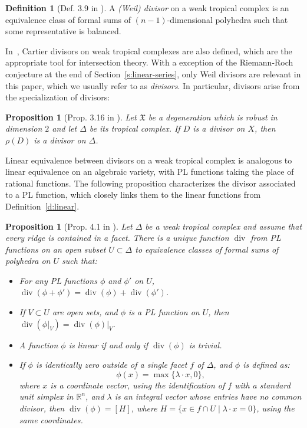 \documentclass[11pt]{amsart}
\newtheorem{prop}[thm]{Proposition}
\theoremstyle{definition}
\newtheorem{defn}[thm]{Definition}
\newcommand{\defi}[1]{\emph{#1}}
\renewcommand{\div}{\operatorname{div}}
\newcommand{\RR}{\mathbb R}
\newcommand{\X}{\mathfrak X}
\begin{document}
\begin{defn}[Def. 3.9 in \cite{cartwright-complexes}]\label{d:divisor}
A \defi{(Weil) divisor} on a weak tropical complex is an equivalence class of
formal sums of $(n-1)$-dimensional polyhedra such that some 
representative is balanced.
\end{defn}

In~\cite{cartwright-complexes}, Cartier divisors on weak tropical complexes are
also defined, which are the appropriate tool for intersection theory. With a
exception of the Riemann-Roch conjecture at the end of
Section~\ref{s:linear-series}, only Weil divisors are relevant in this paper, which we
usually refer to as \defi{divisors}. In particular, divisors arise from the
specialization of divisors:

\begin{prop}[Prop. 3.16 in \cite{cartwright-complexes}]\label{p:specialization-weil}
Let $\X$ be a degeneration which is robust in dimension $2$ and let $\Delta$ be
its tropical complex. If $D$ is a divisor on $X$, then $\rho(D)$ is a divisor on
$\Delta$.
\end{prop}

Linear equivalence between divisors on a weak tropical complex is analogous to
linear equivalence on an algebraic variety, with PL functions taking the place
of rational functions. The following proposition characterizes the divisor
associated to a PL function, which closely links them to the linear functions
from Definition~\ref{d:linear}.

\begin{prop}[Prop. 4.1 in \cite{cartwright-complexes}]\label{p:div}
Let $\Delta$ be a weak tropical complex and assume that every ridge is contained
in a facet. There is a unique function $\div$ from PL functions on  an open
subset $U \subset \Delta$ to equivalence classes of formal sums of polyhedra on
$U$ such that:
\begin{itemize}
\item[(i)] For any PL functions $\phi$ and $\phi'$ on $U$, $\div(\phi+\phi') =
\div(\phi) + \div(\phi')$.
\item[(ii)] If $V \subset U$ are open sets, and $\phi$ is a PL function on $U$,
then $\div(\phi \vert_V) = \div(\phi)\vert_V$.
\item[(iii)] A function $\phi$ is linear if and only if $\div(\phi)$ is trivial.
\item[(iv)] If $\phi$ is identically zero outside of a single facet $f$ of
$\Delta$, and $\phi$ is defined as:
\begin{equation*}
\phi(x) = \max\{ \lambda \cdot x, 0\},
\end{equation*}
where $x$ is a coordinate vector, using the identification of $f$ with a
standard unit simplex in $\RR^n$, and $\lambda$ is an integral vector whose
entries have no common divisor, then $\div(\phi) = [H]$, where $H = \{x \in f
\cap U \mid \lambda \cdot x = 0\}$, using the same coordinates.
\end{itemize}
\end{prop}
\end{document}
